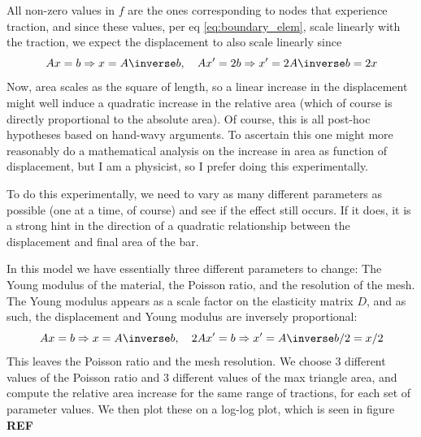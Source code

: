 \documentclass[sigconf]{acmart}
\begin{document}
All non-zero values in $ f $ are the ones corresponding to nodes that experience traction, and since these values, per eq \ref{eq:boundary_elem}, scale linearly with the traction, we expect the displacement to also scale linearly since
\begin{equation}\label{key}
	Ax=b \Rightarrow x = A\inverse b, \quad Ax' = 2b \Rightarrow x'=2A\inverse b = 2x
\end{equation}
Now, area scales as the square of length, so a linear increase in the displacement might well induce a quadratic increase in the relative area (which of course is directly proportional to the absolute area). Of course, this is all post-hoc hypotheses based on hand-wavy arguments. To ascertain this one might more reasonably do a mathematical analysis on the increase in area as function of displacement, but I am a physicist, so I prefer doing this experimentally.

To do this experimentally, we need to vary as many different parameters as possible (one at a time, of course) and see if the effect still occurs. If it does, it is a strong hint in the direction of a quadratic relationship between the displacement and final area of the bar.

In this model we have essentially three different parameters to change: The Young modulus of the material, the Poisson ratio, and the resolution of the mesh. The Young modulus appears as a scale factor on the elasticity matrix $ D $, and as such, the displacement and Young modulus are inversely proportional:
\begin{equation}\label{key}
	Ax=b \Rightarrow x = A\inverse b, \quad 2Ax' = b \Rightarrow x'=A\inverse b/2 = x/2
\end{equation}
This leaves the Poisson ratio and the mesh resolution. We choose 3 different values of the Poisson ratio and 3 different values of the max triangle area, and compute the relative area increase for the same range of tractions, for each set of parameter values. We then plot these on a log-log plot, which is seen in figure \textbf{REF}
\end{document}
